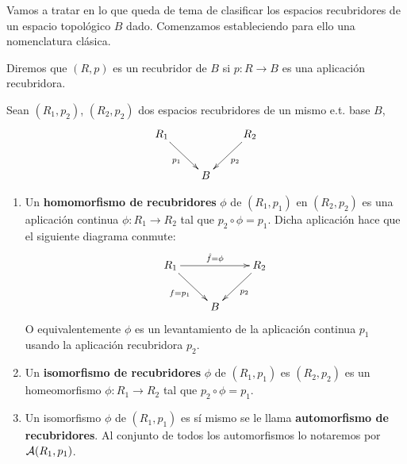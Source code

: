 Vamos a tratar en lo que queda de tema de clasificar los espacios recubridores de un espacio topológico $B$ dado. Comenzamos estableciendo para ello una nomenclatura clásica.

\begin{notacion}
    Diremos que $(R,p)$ es un recubridor de $B$ si $p:R\to B$ es una aplicación recubridora.
\end{notacion}

\begin{definicion}
    Sean $(R_1,p_2)$, $(R_2,p_2)$ dos espacios recubridores de un mismo e.t. base $B$, 
    \begin{gather*}
        \xymatrix{
            R_1 \ar[dr]_{p_1} & & R_2 \ar[dl]^{p_2}\\
            & B
        }
    \end{gather*}
    \begin{enumerate}
        \item Un \textbf{homomorfismo de recubridores} $\phi$ de $(R_1,p_1)$ en $(R_2,p_2)$ es una aplicación continua $\phi:R_1 \to R_2$  tal que $p_2 \circ \phi = p_1$. Dicha aplicación hace que el siguiente diagrama conmute:
        \begin{gather*}
            \xymatrix{
                R_1 \ar[dr]_{f=p_1} \ar[rr]^{\hat{f}=\phi} & & R_2 \ar[dl]^{p_2}\\
                & B
            }
        \end{gather*}
        O equivalentemente $\phi$ es un levantamiento de la aplicación continua $p_1$ usando la aplicación recubridora $p_2$.

        \item Un \textbf{isomorfismo de recubridores} $\phi$ de $(R_1,p_1)$ es $(R_2,p_2)$ es un homeomorfismo $\phi:R_1 \to R_2$ tal que $p_2 \circ \phi = p_1$.

        \item Un isomorfismo $\phi$ de $(R_1,p_1)$ es sí mismo se le llama \textbf{automorfismo de recubridores}. Al conjunto de todos los automorfismos lo notaremos por $\mathcal{A}(R_1,p_1)$.
    \end{enumerate}
\end{definicion}

